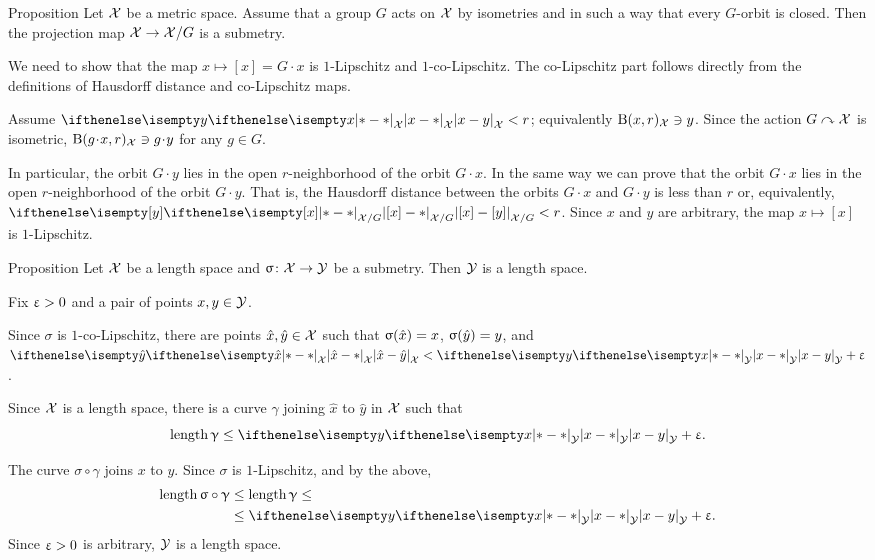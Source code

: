 \begin{thm}{Proposition}\label{prop:submet/G}
Let $\mathcal{X}$ be a metric space.
Assume that a group $G$  acts on $\mathcal{X}$ by isometries  
and in such a way that every $G$-orbit is closed.
Then the projection map $\spc{X}\to \spc{X}/G$ is a submetry.
\end{thm}

We need to show that the map $x\mapsto[x]=G\cdot x$ is $1$-Lipschitz and $1$-co-Lipschitz.
The co-Lipschitz part follows directly from the definitions of Hausdorff distance and co-Lipschitz maps.

Assume $\dist{x}{y}{\spc{X}}< r$; equivalently $\mathrm{B}{}(x,r)_{\mathcal{X}}\ni y$.
Since the action $G\curvearrowright \mathcal{X}$ is isometric, 
$\oBall(g\cdot x,r)_{\spc{X}}\ni g\cdot y$ for any $g\in G$.

In particular, the orbit $G\cdot y$ lies in the open $r$-neighborhood of the orbit $G\cdot x$.
In the same way we can prove that the orbit $G\cdot x$ lies in the open $r$-neighborhood of the orbit $G\cdot y$. 
That is, the Hausdorff distance between the orbits $G\cdot x$ and $G\cdot y$ is less than $r$
or, equivalently, $\dist{[x]}{[y]}{\spc{X}/G}< r$.
Since $x$ and $y$ are arbitrary, the map $x\mapsto[x]$ is $1$-Lipschitz.
\qeds


\begin{thm}{Proposition}
\label{prop:submet-length}
Let  $\mathcal{X}$ be a length space 
and $\sigma\:\spc{X}\to \spc{Y}$ be a submetry.
Then $\mathcal{Y}$ is a length space.
\end{thm}

Fix $\upvarepsilon>0$ and a pair of points $x,y\in \spc{Y}$.

Since $\sigma$ is $1$-co-Lipschitz, there are points $\hat x,\hat y\in \spc{X}$
such that 
$\sigma(\hat x)\z=x$,
$\sigma(\hat y)\z=y$, 
and $\dist{\hat x}{\hat y}{\spc{X}}<\dist{x}{y}{\spc{Y}}+\eps$.

Since $\mathcal{X}$ is a length space, 
there is a curve $\gamma$ 
joining $\hat x$ to $\hat y$ in ${\mathcal{X}}$
such that
\[\length\gamma\le \dist{x}{y}{\spc{Y}}+\eps.\]

The curve $\sigma\circ\gamma$ joins $x$ to $y$.
Since $\sigma$ is $1$-Lipschitz,
and by the above,
\begin{align*}
\length\sigma\circ\gamma&\le \length\gamma\le
\\
&\le\dist{x}{y}{\spc{Y}}+\eps.
\end{align*}
Since $\upvarepsilon>0$ is arbitrary,
$\mathcal{Y}$ is a length space.
\qeds

